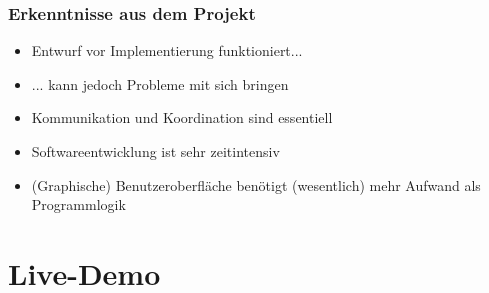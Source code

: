 \documentclass[t]{beamer}
\begin{document}
\begin{frame}
    \frametitle{Erkenntnisse aus dem Projekt}
    \begin{itemize}
        \item<+-> Entwurf vor Implementierung funktioniert...
        \item<+-> ... kann jedoch Probleme mit sich bringen
        \item<+-> Kommunikation und Koordination sind essentiell
        \item<+-> Softwareentwicklung ist sehr zeitintensiv
        \item<+-> (Graphische) Benutzeroberfläche benötigt (wesentlich) mehr Aufwand als Programmlogik
    \end{itemize}
\end{frame}

\section{Live-Demo}


\end{document}
